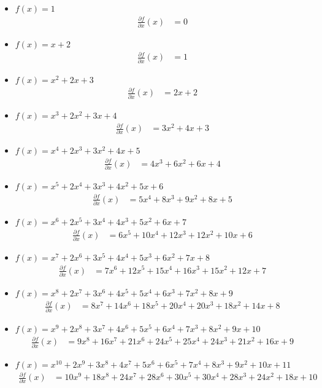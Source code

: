 \documentclass[12pt, a4paper]{article}
\begin{document}
\begin{itemize}
	\item $f(x) = 1$
	\begin{align*}
		\frac{\partial f}{\partial x}(x) &= 0
	\end{align*}
	\item $f(x) = x + 2$
	\begin{align*}
		\frac{\partial f}{\partial x}(x) &= 1
	\end{align*}
	\item $f(x) = x^2 + 2x + 3$
	\begin{align*}
		\frac{\partial f}{\partial x}(x) &= 2x + 2
	\end{align*}
	\item $f(x) = x^3 + 2x^2 + 3x + 4$
	\begin{align*}
		\frac{\partial f}{\partial x}(x) &= 3x^2 + 4x + 3
	\end{align*}
	\item $f(x) = x^4 + 2x^3 + 3x^2 + 4x + 5$
	\begin{align*}
		\frac{\partial f}{\partial x}(x) &= 4x^3 + 6x^2 + 6x + 4
	\end{align*}
	\item $f(x) = x^5 + 2x^4 + 3x^3 + 4x^2 + 5x + 6$
	\begin{align*}
		\frac{\partial f}{\partial x}(x) &= 5x^4 + 8x^3 + 9x^2 + 8x + 5
	\end{align*}
	\item $f(x) = x^6 + 2x^5 + 3x^4 + 4x^3 + 5x^2 + 6x + 7$
	\begin{align*}
		\frac{\partial f}{\partial x}(x) &= 6x^5 + 10x^4 + 12x^3 + 12x^2 + 10x + 6
	\end{align*}
	\item $f(x) = x^7 + 2x^6 + 3x^5 + 4x^4 + 5x^3 + 6x^2 + 7x + 8$
	\begin{align*}
		\frac{\partial f}{\partial x}(x) &= 7x^6 + 12x^5 + 15x^4 + 16x^3 + 15x^2 + 12x + 7
	\end{align*}
	\item $f(x) = x^8 + 2x^7 + 3x^6 + 4x^5 + 5x^4 + 6x^3 + 7x^2 + 8x + 9$
	\begin{align*}
		\frac{\partial f}{\partial x}(x) &= 8x^7 + 14x^6 + 18x^5 + 20x^4 + 20x^3 + 18x^2 + 14x + 8
	\end{align*}
	\item $f(x) = x^9 + 2x^8 + 3x^7 + 4x^6 + 5x^5 + 6x^4 + 7x^3 + 8x^2 + 9x + 10$
	\begin{align*}
		\frac{\partial f}{\partial x}(x) &= 9x^8 + 16x^7 + 21x^6 + 24x^5 + 25x^4 + 24x^3 + 21x^2 + 16x + 9
	\end{align*}
	\item $f(x) = x^{10} + 2x^9 + 3x^8 + 4x^7 + 5x^6 + 6x^5 + 7x^4 + 8x^3 + 9x^2 + 10x + 11$
	\begin{align*}
		\frac{\partial f}{\partial x}(x) &= 10x^9 + 18x^8 + 24x^7 + 28x^6 + 30x^5 + 30x^4 + 28x^3 + 24x^2 + 18x + 10
	\end{align*}
\end{itemize}
\end{document}

